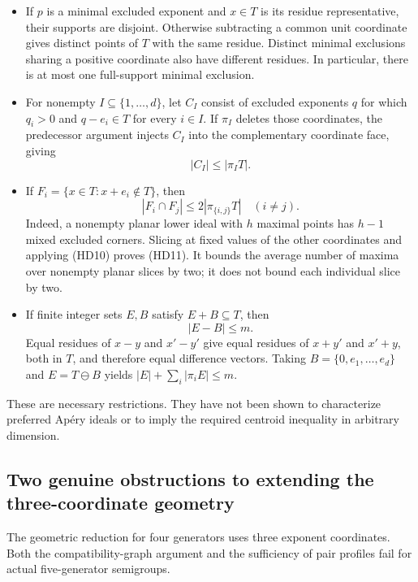 \documentclass[
  11pt,
  a4paper,
]{article}
\providecommand{\tightlist}{%
  \setlength{\itemsep}{0pt}\setlength{\parskip}{0pt}}
\begin{document}
\begin{itemize}
\tightlist
\item
  If \(p\) is a minimal excluded exponent and \(x\in T\) is its residue
  representative, their supports are disjoint. Otherwise subtracting a
  common unit coordinate gives distinct points of \(T\) with the same
  residue. Distinct minimal exclusions sharing a positive coordinate
  also have different residues. In particular, there is at most one
  full-support minimal exclusion.
\item
  For nonempty \(I\subseteq\{1,\ldots,d\}\), let \(C_I\) consist of
  excluded exponents \(q\) for which \(q_i>0\) and \(q-e_i\in T\) for
  every \(i\in I\). If \(\pi_I\) deletes those coordinates, the
  predecessor argument injects \(C_I\) into the complementary coordinate
  face, giving \[
  |C_I|\le|\pi_I T|.
  \tag{HD10}
  \]
\item
  If \(F_i=\{x\in T:x+e_i\notin T\}\), then \[
  |F_i\cap F_j|\le2|\pi_{\{i,j\}}T|\quad(i\ne j).
  \tag{HD11}
  \] Indeed, a nonempty planar lower ideal with \(h\) maximal points has
  \(h-1\) mixed excluded corners. Slicing at fixed values of the other
  coordinates and applying (HD10) proves (HD11). It bounds the average
  number of maxima over nonempty planar slices by two; it does not bound
  each individual slice by two.
\item
  If finite integer sets \(E,B\) satisfy \(E+B\subseteq T\), then \[
  |E-B|\le m.
  \tag{HD12}
  \] Equal residues of \(x-y\) and \(x'-y'\) give equal residues of
  \(x+y'\) and \(x'+y\), both in \(T\), and therefore equal difference
  vectors. Taking \(B=\{0,e_1,\ldots,e_d\}\) and \(E=T\ominus B\) yields
  \(|E|+\sum_i|\pi_iE|\le m\).
\end{itemize}

These are necessary restrictions. They have not been shown to
characterize preferred Apéry ideals or to imply the required centroid
inequality in arbitrary dimension.

\hypertarget{two-genuine-obstructions-to-extending-the-three-coordinate-geometry}{%
\subsection{Two genuine obstructions to extending the three-coordinate
geometry}\label{two-genuine-obstructions-to-extending-the-three-coordinate-geometry}}

The geometric reduction for four generators uses three exponent
coordinates. Both the compatibility-graph argument and the sufficiency
of pair profiles fail for actual five-generator semigroups.
\end{document}
